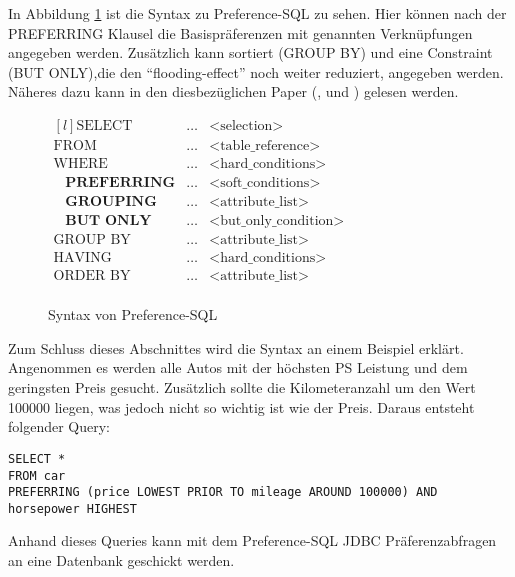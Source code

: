 In Abbildung \ref{img:prefSQLSyntax} ist die Syntax zu Preference-SQL zu sehen. Hier können nach der PREFERRING Klausel die Basispräferenzen mit genannten Verknüpfungen angegeben werden. Zusätzlich kann sortiert (GROUP BY) und eine Constraint (BUT ONLY),die den \enquote{flooding-effect} noch weiter reduziert, angegeben werden. Näheres dazu kann in den diesbezüglichen Paper (\cite{kiessling2011preference}, \cite{kiessling2002foundations} und \cite{kiessling2002preference}) gelesen werden.

\begin{figure}[H]
\centering
$\begin{matrix*}[l]
\text{SELECT} & \ldots & \text{<selection>} \\
\text{FROM} & \ldots & \text{<table\char`_reference>} \\
\text{WHERE} & \ldots & \text{<hard\char`_conditions>} \\
\hspace{10pt} \textbf{PREFERRING} & \ldots & \text{<soft\char`_conditions>} \\
\hspace{10pt} \textbf{GROUPING} & \ldots & \text{<attribute\char`_list>} \\
\hspace{10pt} \textbf{BUT ONLY} & \ldots & \text{<but\char`_only\char`_condition>} \\
\text{GROUP BY} & \ldots & \text{<attribute\char`_list>} \\
\text{HAVING} & \ldots & \text{<hard\char`_conditions>} \\
\text{ORDER BY} & \ldots & \text{<attribute\char`_list>} \\
\end{matrix*}$
	\caption{Syntax von Preference-SQL}
	\label{img:prefSQLSyntax}
\end{figure} 

Zum Schluss dieses Abschnittes wird die Syntax an einem Beispiel erklärt.
Angenommen es werden alle Autos mit der höchsten PS Leistung und dem geringsten Preis gesucht. Zusätzlich sollte die Kilometeranzahl um den Wert 100000 liegen, was jedoch nicht so wichtig ist wie der Preis.
Daraus entsteht folgender Query:
\begin{verbatim}
SELECT * 
FROM car 
PREFERRING (price LOWEST PRIOR TO mileage AROUND 100000) AND
horsepower HIGHEST
\end{verbatim}


Anhand dieses Queries kann mit dem Preference-SQL JDBC Präferenzabfragen an eine Datenbank geschickt werden.
